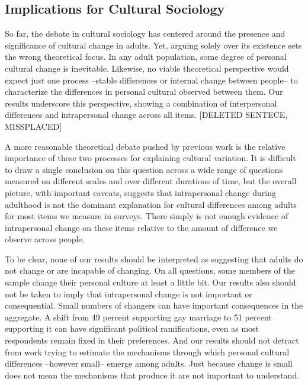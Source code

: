 \documentclass[
  11pt,
]{article}
\begin{document}
\hypertarget{implications-for-cultural-sociology}{%
\subsection{Implications for Cultural
Sociology}\label{implications-for-cultural-sociology}}

So far, the debate in cultural sociology has centered around the
presence and significance of cultural change in adults. Yet, arguing
solely over its existence sets the wrong theoretical focus. In any adult
population, some degree of personal cultural change is inevitable.
Likewise, no viable theoretical perspective would expect just one
process --stable differences or internal change between people-- to
characterize the differences in personal cultural observed between them.
Our results underscore this perspective, showing a combination of
interpersonal differences and intrapersonal change across all items.
{[}DELETED SENTECE, MISSPLACED{]}

A more reasonable theoretical debate pushed by previous work is the
relative importance of these two processes for explaining cultural
variation. It is difficult to draw a single conclusion on this question
across a wide range of questions measured on different scales and over
different durations of time, but the overall picture, with important
caveats, suggests that intrapersonal change during adulthood is not the
dominant explanation for cultural differences among adults for most
items we measure in surveys. There simply is not enough evidence of
intrapersonal change on these items relative to the amount of difference
we observe across people.

To be clear, none of our results should be interpreted as suggesting
that adults do not change or are incapable of changing. On all
questions, some members of the sample change their personal culture at
least a little bit. Our results also should not be taken to imply that
intrapersonal change is not important or consequential. Small numbers of
changers can have important consequences in the aggregate. A shift from
49 percent supporting gay marriage to 51 percent supporting it can have
significant political ramifications, even as most respondents remain
fixed in their preferences. And our results should not detract from work
trying to estimate the mechanisms through which personal cultural
differences --however small-- emerge among adults. Just because change
is small does not mean the mechanisms that produce it are not important
to understand.
\end{document}
